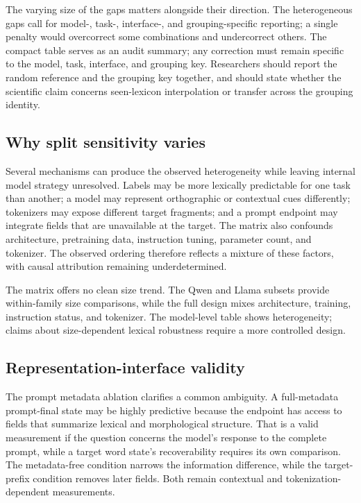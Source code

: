 \documentclass[pdflatex,sn-basic]{sn-jnl}
\begin{document}
The varying size of the gaps matters alongside their direction. The
heterogeneous gaps call for model-, task-, interface-, and grouping-specific
reporting; a single penalty would overcorrect some combinations and undercorrect
others. The compact table serves as an audit summary; any correction must remain
specific to the model, task, interface, and grouping key. Researchers should report the random
reference and the grouping key together,
and should state whether the scientific claim concerns seen-lexicon
interpolation or transfer across the grouping identity.

\subsection{Why split sensitivity varies}

Several mechanisms can produce the observed heterogeneity while leaving
internal model strategy unresolved. Labels may be more lexically predictable
for one task than another; a model may represent orthographic or contextual
cues differently; tokenizers may expose different target fragments; and a
prompt endpoint may integrate fields that are unavailable at the target. The
matrix also confounds architecture, pretraining data, instruction tuning,
parameter count, and tokenizer. The observed ordering therefore reflects a
mixture of these factors, with causal attribution remaining underdetermined.

The matrix offers no clean size trend. The Qwen and Llama subsets provide
within-family size comparisons, while the full design mixes architecture,
training, instruction status, and tokenizer. The model-level table shows
heterogeneity; claims about size-dependent lexical robustness require a more
controlled design.

\subsection{Representation-interface validity}

The prompt metadata ablation clarifies a common ambiguity. A full-metadata
prompt-final state may be highly predictive because the endpoint has access to
fields that summarize lexical and morphological structure. That is a valid
measurement if the question concerns the model's response to the complete
prompt, while a target word state's recoverability requires its own comparison.
The metadata-free condition narrows the information difference, while the
target-prefix condition removes later fields. Both remain contextual and
tokenization-dependent measurements.
\end{document}
